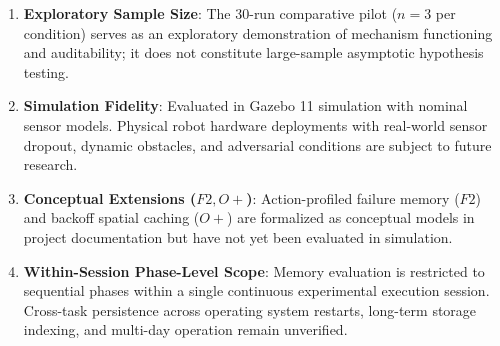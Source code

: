 \begin{enumerate}
    \item \textbf{Exploratory Sample Size}: The 30-run comparative pilot ($n=3$ per condition) serves as an exploratory demonstration of mechanism functioning and auditability; it does not constitute large-sample asymptotic hypothesis testing.
    \item \textbf{Simulation Fidelity}: Evaluated in Gazebo 11 simulation with nominal sensor models. Physical robot hardware deployments with real-world sensor dropout, dynamic obstacles, and adversarial conditions are subject to future research.
    \item \textbf{Conceptual Extensions ($F2, O+$)}: Action-profiled failure memory ($F2$) and backoff spatial caching ($O+$) are formalized as conceptual models in project documentation but have not yet been evaluated in simulation.
    \item \textbf{Within-Session Phase-Level Scope}: Memory evaluation is restricted to sequential phases within a single continuous experimental execution session. Cross-task persistence across operating system restarts, long-term storage indexing, and multi-day operation remain unverified.
\end{enumerate}
